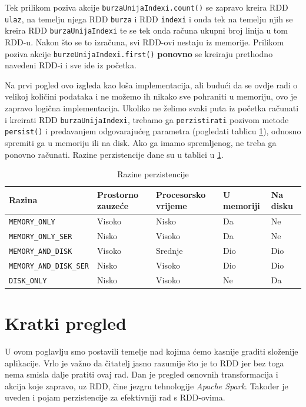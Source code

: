 \documentclass[times, utf8, zavrsni]{fer}
\begin{document}
Tek prilikom poziva akcije \texttt{burzaUnijaIndexi.count()} se zapravo kreira RDD \texttt{ulaz}, na temelju njega RDD \texttt{burza} i RDD \texttt{indexi} i onda tek na temelju njih se kreira RDD \texttt{burzaUnijaIndexi} te se tek onda računa ukupni broj linija u tom RDD-u. Nakon što se to izračuna, svi RDD-ovi nestaju iz memorije.  Prilikom poziva akcije \texttt{burzeUnijaIndexi.first()} \textbf{ponovno} se kreiraju prethodno navedeni RDD-i i sve ide iz početka.

Na prvi pogled ovo izgleda kao loša implementacija, ali budući da se ovdje radi o velikoj količini podataka i ne možemo ih nikako sve pohraniti u memoriju, ovo je zapravo logična implementacija. Ukoliko ne želimo svaki puta iz početka računati i kreirati RDD \texttt{burzaUnijaIndexi}, trebamo ga \texttt{perzistirati} pozivom metode \texttt{persist()} i predavanjem odgovarajućeg parametra (pogledati tablicu \ref{tbl:razinePerzistencije}), odnosno spremiti ga u memoriju ili na disk. Ako ga imamo spremljenog, ne treba ga ponovno računati. Razine perzistencije dane su u tablici u \ref{tbl:razinePerzistencije}.  

\begin{table}[htb]
\scriptsize
\caption{Razine perzistencije}
\label{tbl:razinePerzistencije}
\centering
\begin{tabular}{lllll} 
\hline
Razina & Prostorno zauzeće & Procesorsko vrijeme & U memoriji & Na disku\\
\hline
\texttt{MEMORY\_ONLY} & Visoko & Nisko & Da & Ne  \\
\texttt{MEMORY\_ONLY\_SER} & Nisko & Visoko & Da & Ne  \\
\texttt{MEMORY\_AND\_DISK} & Visoko & Srednje & Dio & Dio \\
\texttt{MEMORY\_AND\_DISK\_SER} & Nisko & Visoko & Dio & Dio \\
\texttt{DISK\_ONLY} & Nisko & Visoko & Ne & Da \\
\hline
\end{tabular}
\end{table}

\section{Kratki pregled}
U ovom poglavlju smo postavili temelje nad kojima ćemo kasnije graditi složenije aplikacije. Vrlo je važno da čitatelj jasno razumije što je to RDD jer bez toga nema smisla dalje pratiti ovaj rad. Dan je pregled osnovnih transformacija i akcija koje zapravo, uz RDD, čine jezgru tehnologije \emph{Apache Spark}. Također je uveden i pojam perzistencije za efektivniji rad s RDD-ovima.
\end{document}
